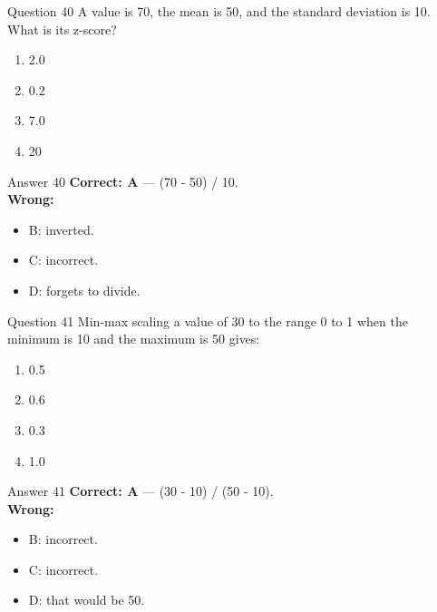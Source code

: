 \documentclass[aspectratio=169,11pt]{beamer}
\begin{document}
\begin{frame}{Question 40}
A value is 70, the mean is 50, and the standard deviation is 10. What is its z-score?
\begin{enumerate}[label=\Alph*.]
\item 2.0
\item 0.2
\item 7.0
\item 20
\end{enumerate}
\end{frame}
\begin{frame}{Answer 40}
\textbf{Correct: A} --- (70 - 50) / 10.\\
\vspace{0.5em}
\textbf{Wrong:}
\begin{itemize}
\item B: inverted.
\item C: incorrect.
\item D: forgets to divide.
\end{itemize}
\end{frame}

\begin{frame}{Question 41}
Min-max scaling a value of 30 to the range 0 to 1 when the minimum is 10 and the maximum is 50 gives:
\begin{enumerate}[label=\Alph*.]
\item 0.5
\item 0.6
\item 0.3
\item 1.0
\end{enumerate}
\end{frame}
\begin{frame}{Answer 41}
\textbf{Correct: A} --- (30 - 10) / (50 - 10).\\
\vspace{0.5em}
\textbf{Wrong:}
\begin{itemize}
\item B: incorrect.
\item C: incorrect.
\item D: that would be 50.
\end{itemize}
\end{frame}
\end{document}
